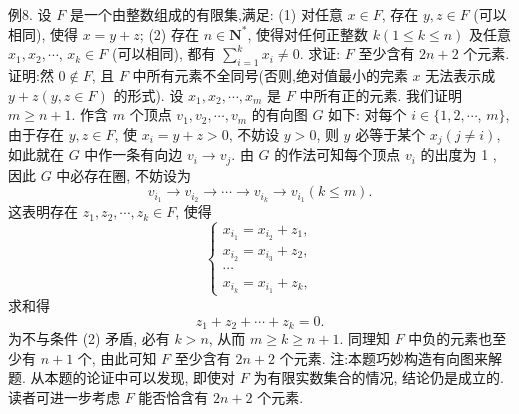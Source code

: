 例8. 设 $F$ 是一个由整数组成的有限集,满足:
(1) 对任意 $x \in F$, 存在 $y, z \in F$ (可以相同), 使得 $x=y+z$;
(2) 存在 $n \in \mathbf{N}^*$, 使得对任何正整数 $k(1 \leqslant k \leqslant n)$ 及任意 $x_1, x_2, \cdots$, $x_k \in F$ (可以相同), 都有 $\sum_{i=1}^k x_i \neq 0$.
求证: $F$ 至少含有 $2 n+2$ 个元素.
证明:然 $0 \notin F$, 且 $F$ 中所有元素不全同号(否则,绝对值最小的完素 $x$ 无法表示成 $y+z(y, z \in F)$ 的形式).
设 $x_1, x_2, \cdots, x_m$ 是 $F$ 中所有正的元素.
我们证明 $m \geqslant n+1$.
作含 $m$ 个顶点 $v_1, v_2, \cdots, v_m$ 的有向图 $G$ 如下: 对每个 $i \in\{1,2, \cdots$, $m\}$, 由于存在 $y, z \in F$, 使 $x_i=y+z>0$, 不妨设 $y>0$, 则 $y$ 必等于某个 $x_j(j \neq i)$, 如此就在 $G$ 中作一条有向边 $v_i \rightarrow v_j$.
由 $G$ 的作法可知每个顶点 $v_i$ 的出度为 1 , 因此 $G$ 中必存在圈, 不妨设为
$$
v_{i_1} \rightarrow v_{i_2} \rightarrow \cdots \rightarrow v_{i_k} \rightarrow v_{i_1}(k \leqslant m) .
$$
这表明存在 $z_1, z_2, \cdots, z_k \in F$, 使得
$$
\left\{\begin{array}{l}
x_{i_1}=x_{i_2}+z_1, \\
x_{i_2}=x_{i_3}+z_2, \\
\cdots \\
x_{i_k}=x_{i_1}+z_k,
\end{array}\right.
$$
求和得
$$
z_1+z_2+\cdots+z_k=0 .
$$
为不与条件 (2) 矛盾, 必有 $k>n$, 从而 $m \geqslant k \geqslant n+1$.
同理知 $F$ 中负的元素也至少有 $n+1$ 个, 由此可知 $F$ 至少含有 $2 n+2$ 个元素.
注:本题巧妙构造有向图来解题.
从本题的论证中可以发现, 即使对 $F$ 为有限实数集合的情况, 结论仍是成立的.
读者可进一步考虑 $F$ 能否恰含有 $2 n+2$ 个元素.


